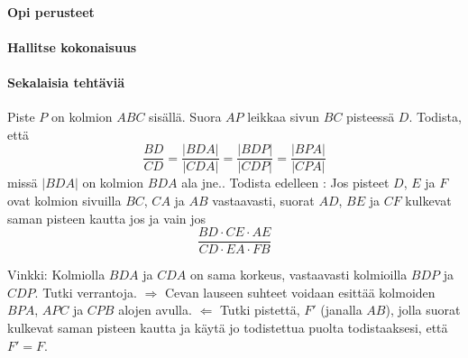 
\begin{tehtavasivu}
\paragraph*{Opi perusteet}

\paragraph*{Hallitse kokonaisuus}

\paragraph*{Sekalaisia tehtäviä}

\begin{tehtava}
Piste $P$ on kolmion $ABC$ sisällä. Suora $AP$ leikkaa sivun $BC$ pisteessä $D$. Todista, että
\[
\frac{BD}{CD} = \frac{|BDA|}{|CDA|} = \frac{|BDP|}{|CDP|} = \frac{|BPA|}{|CPA|}
\]
missä $|BDA|$ on kolmion $BDA$ ala jne.. Todista edelleen : Jos pisteet $D$, $E$ ja $F$ ovat kolmion sivuilla $BC$, $CA$ ja $AB$ vastaavasti, suorat $AD$, $BE$ ja $CF$ kulkevat saman pisteen kautta jos ja vain jos
\[
\frac{BD\cdot CE \cdot AE}{CD \cdot EA \cdot FB}
\]
\begin{vastaus}
Vinkki: Kolmiolla $BDA$ ja $CDA$ on sama korkeus, vastaavasti kolmioilla $BDP$ ja $CDP$. Tutki verrantoja. $\Rightarrow$ Cevan lauseen suhteet voidaan esittää kolmoiden $BPA$, $APC$ ja $CPB$ alojen avulla. $\Leftarrow$ Tutki pistettä, $F'$ (janalla $AB$), jolla suorat kulkevat saman pisteen kautta ja käytä jo todistettua puolta todistaaksesi, että $F' = F$.
\end{vastaus}
\end{tehtava}
\end{tehtavasivu}

